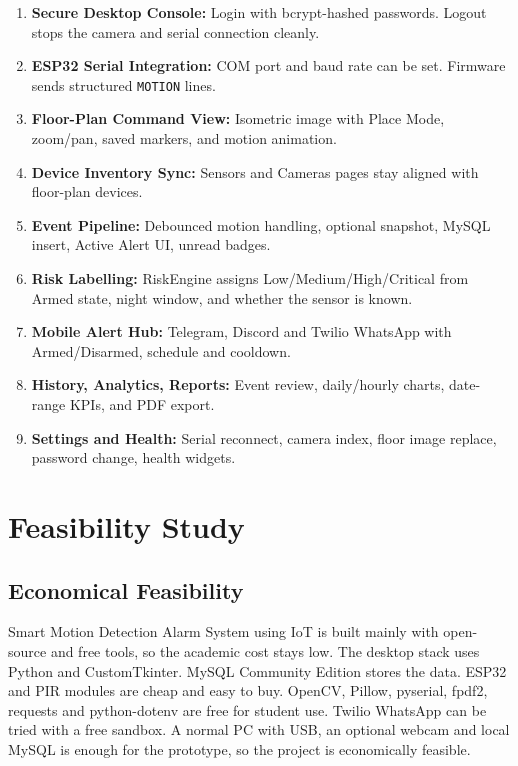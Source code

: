 \documentclass[12pt,a4paper]{report}
\begin{document}
\begin{enumerate}

    \item \textbf{Secure Desktop Console:} Login with bcrypt-hashed passwords. Logout stops the camera and serial connection cleanly.

    \item \textbf{ESP32 Serial Integration:} COM port and baud rate can be set. Firmware sends structured \texttt{MOTION} lines.

    \item \textbf{Floor-Plan Command View:} Isometric image with Place Mode, zoom/pan, saved markers, and motion animation.

    \item \textbf{Device Inventory Sync:} Sensors and Cameras pages stay aligned with floor-plan devices.

    \item \textbf{Event Pipeline:} Debounced motion handling, optional snapshot, MySQL insert, Active Alert UI, unread badges.

    \item \textbf{Risk Labelling:} RiskEngine assigns Low/Medium/High/Critical from Armed state, night window, and whether the sensor is known.

    \item \textbf{Mobile Alert Hub:} Telegram, Discord and Twilio WhatsApp with Armed/Disarmed, schedule and cooldown.

    \item \textbf{History, Analytics, Reports:} Event review, daily/hourly charts, date-range KPIs, and PDF export.

    \item \textbf{Settings and Health:} Serial reconnect, camera index, floor image replace, password change, health widgets.

\end{enumerate}

\section{Feasibility Study}

\subsection{Economical Feasibility}

Smart Motion Detection Alarm System using IoT is built mainly with open-source and free tools, so the academic cost stays low. The desktop stack uses Python and CustomTkinter. MySQL Community Edition stores the data. ESP32 and PIR modules are cheap and easy to buy. OpenCV, Pillow, pyserial, fpdf2, requests and python-dotenv are free for student use. Twilio WhatsApp can be tried with a free sandbox. A normal PC with USB, an optional webcam and local MySQL is enough for the prototype, so the project is economically feasible.
\end{document}
